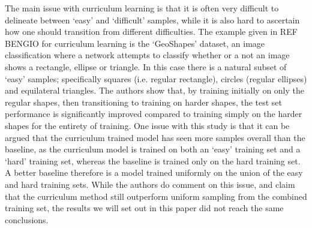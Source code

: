 The main issue with curriculum learning is that it is often very difficult to delineate between `easy' and `difficult' samples, while it is also hard to ascertain how one should transition from different difficulties. The example given in REF BENGIO  for curriculum learning is the `GeoShapes' dataset, an image classification where a network attempts to classify whether or a not an image shows a rectangle, ellipse or triangle. In this case there is a natural subset of `easy' samples; specifically squares (i.e. regular rectangle), circles (regular ellipses) and equilateral triangles. The authors show that, by training initially on only the regular shapes, then transitioning to training on harder shapes, the test set performance is significantly improved compared to training simply on the harder shapes for the entirety of training. One issue with this study is that it can be argued that the curriculum trained model has seen more samples overall than the baseline, as the curriculum model is trained on both an `easy' training set and a `hard' training set, whereas the baseline is trained only on the hard training set. A better baseline therefore is a model trained uniformly on the union of the easy and hard training sets. While the authors do comment on this issue, and claim that the curriculum method still outperform uniform sampling from the combined training set, the results we will set out in this paper did not reach the same conclusions. 


